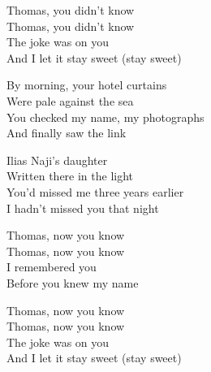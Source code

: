 \begin{lyrics}
Thomas, you didn't know\\
Thomas, you didn't know\\
The joke was on you\\
And I let it stay sweet
(stay sweet)

By morning, your hotel curtains\\
Were pale against the sea\\
You checked my name, my photographs\\
And finally saw the link

Ilias Naji's daughter\\
Written there in the light\\
You'd missed me three years earlier\\
I hadn't missed you that night

Thomas, now you know\\
Thomas, now you know\\
I remembered you\\
Before you knew my name

Thomas, now you know\\
Thomas, now you know\\
The joke was on you\\
And I let it stay sweet
(stay sweet)
\end{lyrics}

